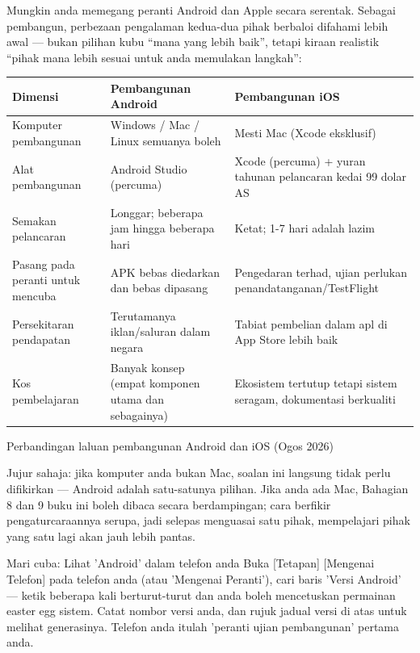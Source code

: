 
Mungkin anda memegang peranti Android dan Apple secara serentak. Sebagai pembangun, perbezaan pengalaman kedua-dua pihak berbaloi difahami lebih awal — bukan pilihan kubu “mana yang lebih baik”, tetapi kiraan realistik “pihak mana lebih sesuai untuk anda memulakan langkah”:

\begin{center}
\begin{tabularx}{\linewidth}{|X|X|X|}
\hline
\textbf{Dimensi} & \textbf{Pembangunan Android} & \textbf{Pembangunan iOS} \tabularnewline
\hline
Komputer pembangunan & Windows / Mac / Linux semuanya boleh & Mesti Mac (Xcode eksklusif) \tabularnewline
Alat pembangunan & Android Studio (percuma) & Xcode (percuma) + yuran tahunan pelancaran kedai 99 dolar AS \tabularnewline
Semakan pelancaran & Longgar; beberapa jam hingga beberapa hari & Ketat; 1-7 hari adalah lazim \tabularnewline
Pasang pada peranti untuk mencuba & APK bebas diedarkan dan bebas dipasang & Pengedaran terhad, ujian perlukan penandatanganan/TestFlight \tabularnewline
Persekitaran pendapatan & Terutamanya iklan/saluran dalam negara & Tabiat pembelian dalam apl di App Store lebih baik \tabularnewline
Kos pembelajaran & Banyak konsep (empat komponen utama dan sebagainya) & Ekosistem tertutup tetapi sistem seragam, dokumentasi berkualiti \tabularnewline
\hline
\end{tabularx}
\end{center}

\begin{center}\small\color{gray}Perbandingan laluan pembangunan Android dan iOS (Ogos 2026)\end{center}

Jujur sahaja: jika komputer anda bukan Mac, soalan ini langsung tidak perlu difikirkan — Android adalah satu-satunya pilihan. Jika anda ada Mac, Bahagian 8 dan 9 buku ini boleh dibaca secara berdampingan; cara berfikir pengaturcaraannya serupa, jadi selepas menguasai satu pihak, mempelajari pihak yang satu lagi akan jauh lebih pantas.

\begin{tcbpractice}{Mari cuba: Lihat 'Android' dalam telefon anda}
Buka [Tetapan] [Mengenai Telefon] pada telefon anda (atau 'Mengenai Peranti'), cari baris 'Versi Android' — ketik beberapa kali berturut-turut dan anda boleh mencetuskan permainan easter egg sistem. Catat nombor versi anda, dan rujuk jadual versi di atas untuk melihat generasinya. Telefon anda itulah 'peranti ujian pembangunan' pertama anda.

\end{tcbpractice}

